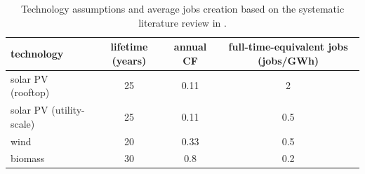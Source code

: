 \documentclass[3p]{elsarticle} %
\begin{document}
\begin{table}[!h]
\footnotesize
\centering
\begin{threeparttable}
\caption{Technology assumptions and average jobs creation based on the systematic literature review in \cite{Low_carbon_jobs}.} \label{tab_jobs}
\centering
\begin{tabularx}{14cm}{lccc}
\toprule
	technology & lifetime (years) &	annual CF &	full-time-equivalent jobs (jobs/GWh) \\
\midrule
solar PV (rooftop) 	& 25	& 0.11 &	2 \\
solar PV (utility-scale)	& 25	& 0.11 &	0.5 \\
wind	& 20	& 0.33 &	0.5 \\
biomass	& 30	& 0.8	& 0.2 \\
\bottomrule
\end{tabularx}
\end{threeparttable}
\end{table}



\FloatBarrier





\end{document}
